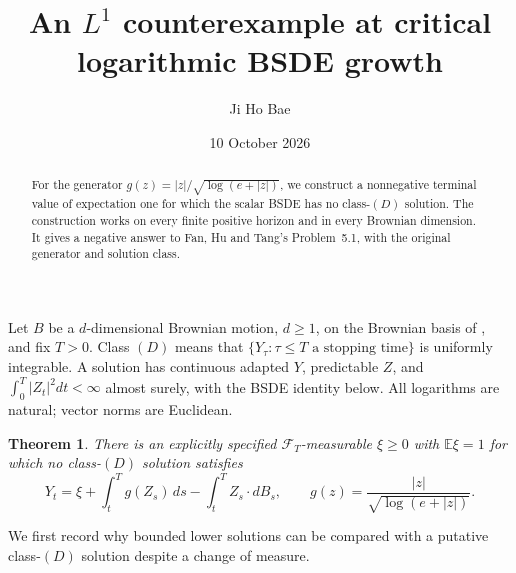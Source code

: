 \documentclass[11pt]{article}
\title{An $L^1$ counterexample at critical logarithmic BSDE growth}
\author{Ji Ho Bae}
\date{10 October 2026}
\newtheorem{theorem}{Theorem}
\newcommand{\E}{\mathbb E}
\newcommand{\F}{\mathcal F}
\begin{document}
\maketitle
\begin{abstract}
For the generator $g(z)=|z|/\sqrt{\log(e+|z|)}$, we construct a nonnegative
terminal value of expectation one for which the scalar BSDE has no
class-$(D)$ solution. The construction works on every finite positive
horizon and in every Brownian dimension. It gives a negative answer to
Fan, Hu and Tang's Problem~5.1, with the original generator and solution class.
\end{abstract}

Let $B$ be a $d$-dimensional Brownian motion, $d\geq1$, on the Brownian
basis of \cite{FHT}, and fix $T>0$. Class $(D)$ means that
$\{Y_\tau:\tau\leq T\text{ a stopping time}\}$ is uniformly integrable.
A solution has continuous adapted $Y$, predictable $Z$, and
$\int_0^T|Z_t|^2dt<\infty$ almost surely, with the BSDE identity below.
All logarithms are natural; vector norms are Euclidean.

\begin{theorem}\label{main}
There is an explicitly specified $\F_T$-measurable $\xi\geq0$ with
$\E\xi=1$ for which no class-$(D)$ solution satisfies
\begin{equation}\label{bsde}
 Y_t=\xi+\int_t^T g(Z_s)\,ds-\int_t^T Z_s\cdot dB_s,
 \qquad g(z)=\frac{|z|}{\sqrt{\log(e+|z|)}}.
\end{equation}
\end{theorem}

We first record why bounded lower solutions can be compared with a
putative class-$(D)$ solution despite a change of measure.
\end{document}
